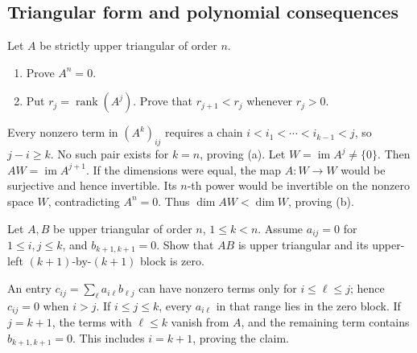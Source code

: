 \subsection*{Triangular form and polynomial consequences}
\begin{problem}\label{ex:08:nilpotent}
Let \(A\) be strictly upper triangular of order \(n\).
\begin{enumerate}
\item Prove \(A^n=0\).
\item Put \(r_j=\operatorname{rank}(A^j)\). Prove that
\(r_{j+1}<r_j\) whenever \(r_j>0\).
\end{enumerate}
\end{problem}
\begin{solution}
Every nonzero term in \((A^k)_{ij}\) requires a chain
\(i<i_1<\cdots<i_{k-1}<j\), so \(j-i\geqslant k\).
No such pair exists for \(k=n\), proving (a).
Let \(W=\operatorname{im}A^j\ne\{0\}\). Then \(AW=\operatorname{im}A^{j+1}\).
If the dimensions were equal, the map \(A:W\to W\) would be surjective
and hence invertible. Its \(n\)-th power would be invertible on the
nonzero space \(W\), contradicting \(A^n=0\).
Thus \(\dim AW<\dim W\), proving (b).
\end{solution}

\begin{problem}\label{ex:08:triangular-product}
Let \(A,B\) be upper triangular of order \(n\), \(1\leqslant k<n\).
Assume \(a_{ij}=0\) for \(1\leqslant i,j\leqslant k\), and
\(b_{k+1,k+1}=0\). Show that \(AB\) is upper triangular and its
upper-left \((k+1)\)-by-\((k+1)\) block is zero.
\end{problem}
\begin{solution}
An entry \(c_{ij}=\sum_\ell a_{i\ell}b_{\ell j}\) can have nonzero
terms only for \(i\leqslant\ell\leqslant j\); hence \(c_{ij}=0\)
when \(i>j\). If \(i\leqslant j\leqslant k\), every \(a_{i\ell}\)
in that range lies in the zero block. If \(j=k+1\), the terms with
\(\ell\leqslant k\) vanish from \(A\), and the remaining term contains
\(b_{k+1,k+1}=0\). This includes \(i=k+1\), proving the claim.
\end{solution}

